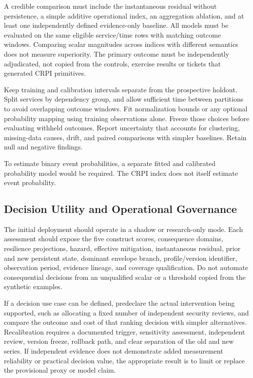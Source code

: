 \documentclass[11pt]{article}
\begin{document}
A credible comparison must include the instantaneous
residual without persistence, a simple additive operational
index, an aggregation ablation, and at least one
independently defined evidence-only baseline. All models
must be evaluated on the same eligible service/time rows
with matching outcome windows. Comparing scalar
magnitudes across indices with different semantics does
not measure superiority. The primary outcome must be
independently adjudicated, not copied from the controls,
exercise results or tickets that generated CRPI primitives.

Keep training and calibration intervals separate from the
prospective holdout. Split services by dependency group,
and allow sufficient time between partitions to avoid
overlapping outcome windows. Fit normalization bounds or
any optional probability mapping using training observations
alone. Freeze those choices before evaluating withheld
outcomes. Report uncertainty that accounts for clustering,
missing-data causes, drift, and paired comparisons with
simpler baselines. Retain null and negative findings.

To estimate binary event probabilities, a separate fitted
and calibrated probability model would be required.
The CRPI index does not itself estimate event probability.

\subsection{Decision Utility and Operational Governance}
The initial deployment should operate in a shadow or
research-only mode. Each assessment should expose
the five construct scores, consequence domains,
resilience projections, hazard, effective mitigation,
instantaneous residual, prior and new persistent state,
dominant envelope branch, profile/version identifier,
observation period, evidence lineage, and coverage
qualification. Do not automate consequential decisions
from an unqualified scalar or a threshold copied from
the synthetic examples.

If a decision use case can be defined, predeclare
the actual intervention being supported, such as
allocating a fixed number of independent security
reviews, and compare the outcome and cost of that
ranking decision with simpler alternatives. Recalibration
requires a documented trigger, sensitivity assessment,
independent review, version freeze, rollback path,
and clear separation of the old and new series.
If independent evidence does not demonstrate added
measurement reliability or practical decision value,
the appropriate result is to limit or replace the
provisional proxy or model claim.
\end{document}
